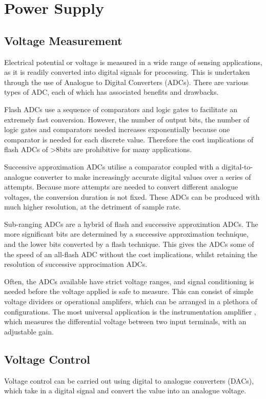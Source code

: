 \section{Power Supply}
\subsection{Voltage Measurement}
\label{volt-meas}
Electrical potential or voltage is measured in a wide range of sensing applications, as it is readily converted into digital signals for processing. This is undertaken through the use of Analogue to Digital Converters (ADCs). There are various types of ADC, each of which has associated benefits and drawbacks.

Flash ADCs use a sequence of comparators and logic gates to facilitate an extremely fast conversion. However, the number of output bits, the number of logic gates and comparators needed increases exponentially because one comparator is needed for each discrete value. Therefore the cost implications of flash ADCs of >8bits are prohibitive for many applications.

Successive approximation ADCs utilise a comparator coupled with a digital-to-analogue converter to make increasingly accurate digital values over a series of attempts. Because more attempts are needed to convert different analogue voltages, the conversion duration is not fixed. These ADCs can be produced with much higher resolution, at the detriment of sample rate.

Sub-ranging ADCs are a hybrid of flash and successive approximtion ADCs. The more significant bits are determined by a successive approximation technique, and the lower bits converted by a flash technique. This gives the ADCs some of the speed of an all-flash ADC without the cost implications, whilst retaining the resolution of successive approcimation ADCs.

Often, the ADCs available have strict voltage ranges, and signal conditioning is needed before the voltage applied is safe to measure. This can consist of simple voltage dividers or operational amplifers, which can be arranged in a plethora of configurations. The most universal application is the instrumentation amplifier \cite{instr-amp}, which measures the differential voltage between two input terminals, with an adjustable gain.


\subsection{Voltage Control}
Voltage control can be carried out using digital to analogue converters (DACs), which take in a digital signal and convert the value into an analogue voltage. 

